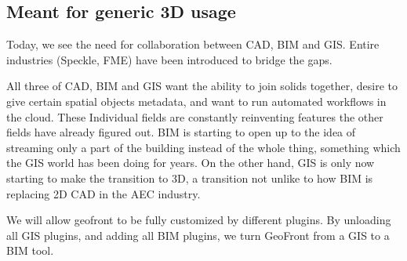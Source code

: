 \subsection{Meant for generic 3D usage}


Today, we see the need for collaboration between CAD, BIM and GIS. Entire industries (Speckle, FME) have been introduced to bridge the gaps. 

All three of CAD, BIM and GIS want the ability to join solids together, desire to give certain spatial objects metadata, and want to run automated workflows in the cloud. These Individual fields are constantly reinventing features the other fields have already figured out. BIM is starting to open up to the idea of streaming only a part of the building instead of the whole thing, something which the GIS world has been doing for years. On the other hand, GIS is only now starting to make the transition to 3D, a transition not unlike to how BIM is replacing 2D CAD in the AEC industry. 

We will allow geofront to be fully customized by different plugins. By unloading all GIS plugins, and adding all BIM plugins, we turn GeoFront from a GIS to a BIM tool.






